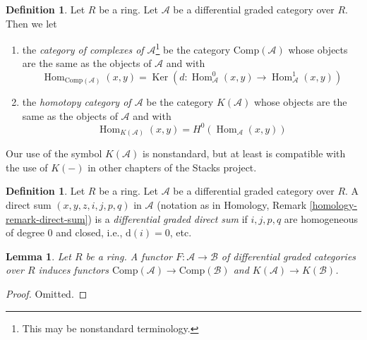 \documentclass{stacks-project}
\theoremstyle{plain}
\newtheorem{lemma}[subsection]{Lemma}
\theoremstyle{definition}
\newtheorem{definition}[subsection]{Definition}
\theoremstyle{remark}
\numberwithin{equation}{subsection}
\def\Hom{\mathop{\mathrm{Hom}}\nolimits}
\def\Ker{\mathop{\mathrm{Ker}}}
\begin{document}
\begin{definition}
\label{definition-homotopy-category-of-dga-category}
Let $R$ be a ring. Let $\mathcal{A}$ be a differential graded category
over $R$. Then we let
\begin{enumerate}
\item the {\it category of complexes of $\mathcal{A}$}\footnote{This may
be nonstandard terminology.} be the category
$\text{Comp}(\mathcal{A})$ whose objects are the same as the objects
of $\mathcal{A}$ and with
$$
\Hom_{\text{Comp}(\mathcal{A})}(x, y) =
\Ker(d : \Hom^0_\mathcal{A}(x, y) \to \Hom^1_\mathcal{A}(x, y))
$$
\item the {\it homotopy category of $\mathcal{A}$} be the category
$K(\mathcal{A})$ whose objects are the same as the objects
of $\mathcal{A}$ and with
$$
\Hom_{K(\mathcal{A})}(x, y) = H^0(\Hom_\mathcal{A}(x, y))
$$
\end{enumerate}
\end{definition}

\noindent
Our use of the symbol $K(\mathcal{A})$ is nonstandard, but at least
is compatible with the use of $K(-)$ in other chapters of the Stacks project.

\begin{definition}
\label{definition-dg-direct-sum}
Let $R$ be a ring. Let $\mathcal{A}$ be a differential graded category over
$R$. A direct sum $(x, y, z, i, j, p, q)$ in $\mathcal{A}$ (notation as in
Homology, Remark \ref{homology-remark-direct-sum})
is a {\it differential graded direct sum} if $i, j, p, q$ are homogeneous
of degree $0$ and closed, i.e., $\text{d}(i) = 0$, etc.
\end{definition}

\begin{lemma}
\label{lemma-functorial}
Let $R$ be a ring. A functor $F : \mathcal{A} \to \mathcal{B}$
of differential graded categories over $R$ induces functors
$\text{Comp}(\mathcal{A}) \to \text{Comp}(\mathcal{B})$
and $K(\mathcal{A}) \to K(\mathcal{B})$.
\end{lemma}

\begin{proof}
Omitted.
\end{proof}
\end{document}
